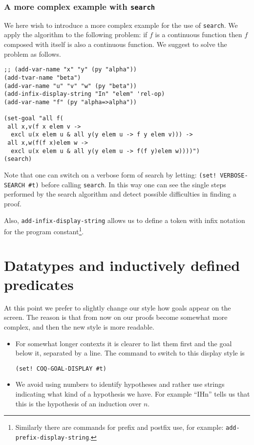 \documentclass[12pt]{amsart}
\newcommand{\inquotes}[1]{``#1''}
\begin{document}
\subsubsection{A more complex example with \texttt{search}}
We here wish to introduce a more complex example for the use of
\texttt{search}.  We apply the algorithm to the following problem: if
$f$ is a continuous function then $f$ composed with itself is also a
continuous function.  We suggest to solve the problem as follows.
\begin{verbatim}
;; (add-var-name "x" "y" (py "alpha"))
(add-tvar-name "beta")
(add-var-name "u" "v" "w" (py "beta"))
(add-infix-display-string "In" "elem" 'rel-op)
(add-var-name "f" (py "alpha=>alpha"))

(set-goal "all f(
 all x,v(f x elem v -> 
  excl u(x elem u & all y(y elem u -> f y elem v))) ->
 all x,w(f(f x)elem w -> 
  excl u(x elem u & all y(y elem u -> f(f y)elem w))))")
(search)
\end{verbatim}
Note that one can switch on a verbose form of search by letting:
\texttt{(set! VERBOSE-SEARCH \#t)} before calling \texttt{search}. In
this way one can see the single steps performed by the search
algorithm and detect possible difficulties in finding a proof.

Also, \texttt{add-infix-display-string} allows us to define a token
with infix notation for the program constant\footnote{Similarly there
  are commands for prefix and postfix use, for example:
  \texttt{add-prefix-display-string}.}.

\section{Datatypes and inductively defined predicates}
\label{Datatypes}
At this point we prefer to slightly change our style how goals appear
on the screen.  The reason is that from now on our proofs become
somewhat more complex, and then the new style is more readable.
\begin{itemize}
\item For somewhat longer contexts it is clearer to list them first
  and the goal below it, separated by a line.  The command to switch
  to this display style is
\begin{verbatim}
(set! COQ-GOAL-DISPLAY #t)
\end{verbatim}
\item We avoid using numbers to identify hypotheses and rather use
  strings indicating what kind of a hypothesis we have.  For example
  \inquotes{IHn} tells us that this is the hypothesis of an induction
  over $n$.
\end{itemize}
\end{document}
